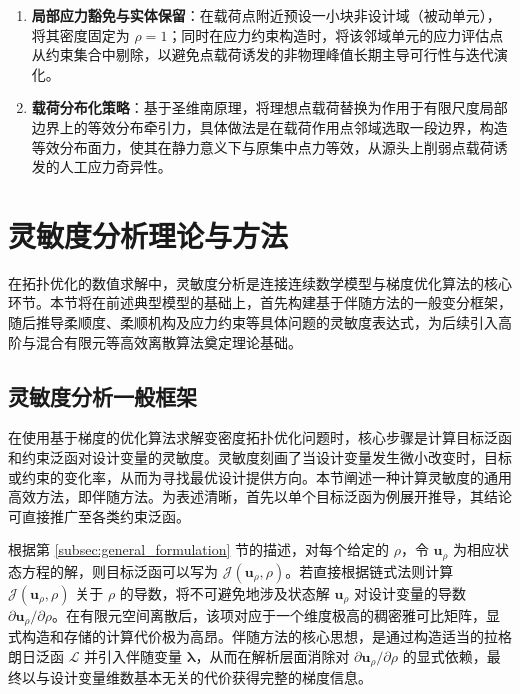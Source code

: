 \begin{enumerate}
	\item \textbf{局部应力豁免与实体保留}：在载荷点附近预设一小块非设计域（被动单元），将其密度固定为 $\rho=1$；同时在应力约束构造时，将该邻域单元的应力评估点从约束集合中剔除，以避免点载荷诱发的非物理峰值长期主导可行性与迭代演化。
	
	\item \textbf{载荷分布化策略}：基于圣维南原理，将理想点载荷替换为作用于有限尺度局部边界上的等效分布牵引力，具体做法是在载荷作用点邻域选取一段边界，构造等效分布面力，使其在静力意义下与原集中点力等效，从源头上削弱点载荷诱发的人工应力奇异性。
\end{enumerate}


\section{灵敏度分析理论与方法}
\label{sec:sensitivity_analysis}

在拓扑优化的数值求解中，灵敏度分析是连接连续数学模型与梯度优化算法的核心环节。本节将在前述典型模型的基础上，首先构建基于伴随方法的一般变分框架，随后推导柔顺度、柔顺机构及应力约束等具体问题的灵敏度表达式，为后续引入高阶与混合有限元等高效离散算法奠定理论基础。


\subsection{灵敏度分析一般框架}
\label{subsec:sensitivity_framework}

在使用基于梯度的优化算法求解变密度拓扑优化问题时，核心步骤是计算目标泛函和约束泛函对设计变量的灵敏度。灵敏度刻画了当设计变量发生微小改变时，目标或约束的变化率，从而为寻找最优设计提供方向。本节阐述一种计算灵敏度的通用高效方法，即伴随方法。为表述清晰，首先以单个目标泛函为例展开推导，其结论可直接推广至各类约束泛函。

根据第 \ref{subsec:general_formulation} 节的描述，对每个给定的 $\rho$，令 $\boldsymbol{u}_\rho$ 为相应状态方程的解，则目标泛函可以写为 $\mathcal{J}(\boldsymbol{u}_\rho, \rho)$。若直接根据链式法则计算 $\mathcal{J}(\boldsymbol{u}_\rho, \rho)$ 关于 $\rho$ 的导数，将不可避免地涉及状态解 $\boldsymbol{u}_\rho$ 对设计变量的导数 $\partial\boldsymbol{u}_\rho/\partial\rho$。在有限元空间离散后，该项对应于一个维度极高的稠密雅可比矩阵，显式构造和存储的计算代价极为高昂。伴随方法的核心思想，是通过构造适当的拉格朗日泛函 $\mathcal{L}$ 并引入伴随变量 $\boldsymbol{\lambda}$，从而在解析层面消除对 $\partial\boldsymbol{u}_\rho/\partial\rho$ 的显式依赖，最终以与设计变量维数基本无关的代价获得完整的梯度信息。

